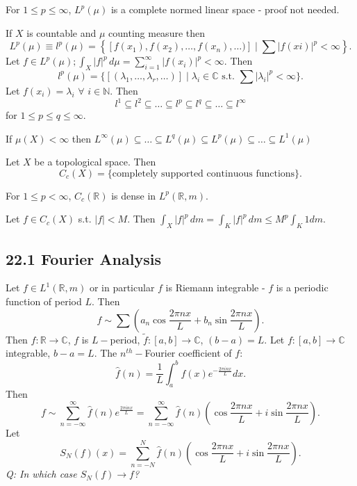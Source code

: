 \documentclass{functionspaces}
\begin{document}
\begin{theorem}\label{thm:Lp_complete}
For $1\leq p\leq\infty$, $L^{p}(\mu)$ is a complete normed linear space - proof not needed.
\end{theorem}

\begin{remark}\label{rem:lp_space}
If $X$ is countable and $\mu$ counting measure then
\[
L^{p}(\mu)\equiv l^{p}(\mu)=\left\{[f(x_{1}),f(x_{2}),\ldots,f(x_{n}),\ldots)]\mid\sum|f(xi)|^{p}<\infty\right\}.
\]
Let $f\in L^{p}(\mu);\int_{X}|f|^{p}\,d\mu=\sum_{i=1}^{\infty}|f(x_{i})|^{p}<\infty.$ Then
\[
l^{p}(\mu)=\{[(\lambda_{1},\ldots,\lambda_{r},\ldots)]\mid\lambda_{i}\in\mathbb{C}\text{ s.t. }\sum|\lambda_{i}|^{p}<\infty\}.
\]
Let $f(x_{i})=\lambda_{i}$ $\forall$ $i\in\mathbb{N}.$ Then
\[
l^{1}\subseteq l^{2}\subseteq\ldots\subseteq l^{p}\subseteq l^{q}\subseteq\ldots\subseteq l^{\infty}
\]
for $1\leq p\leq q\leq\infty.$
\end{remark}

\begin{theorem}\label{thm:Lp_inclusion}
If $\mu(X)<\infty$ then $L^{\infty}(\mu)\subseteq\ldots\subseteq L^{q}(\mu)\subseteq L^{p}(\mu)\subseteq\ldots\subseteq L^{1}(\mu)$
\end{theorem}

\begin{definition}\label{def:Cc}
Let $X$ be a topological space. Then
\[
C_{c}(X)=\{\text{completely supported continuous functions}\}.
\]
\end{definition}

\begin{theorem}\label{thm:Cc_dense}
For $1\leq p<\infty$, $C_{c}(\mathbb{R})$ is dense in $L^{p}(\mathbb{R},m).$
\end{theorem}

Let $f\in C_{c}(X)$ s.t. $|f|<M$. Then $\int_{X}|f|^{p}\,dm=\int_{K}|f|^{p}\,dm\leq M^{p}\int_{K}1dm.$

\subsection*{22.1 Fourier Analysis}

Let $f\in L^{1}(\mathbb{R},m)$ or in particular $f$ is Riemann integrable - $f$ is a periodic function of period $L$. Then
\[
f\sim\sum\left(a_{n}\cos\frac{2\pi nx}{L}+b_{n}\sin\frac{2\pi nx}{L}\right).
\]
Then $f:\mathbb{R}\rightarrow\mathbb{C}$, $f$ is $L-$period, $\tilde{f}:[a,b]\rightarrow\mathbb{C}$, $(b-a)=L$. Let $f:[a,b]\rightarrow\mathbb{C}$ integrable, $b-a=L$. The $n^{th}-$Fourier coefficient of $f$:
\[
\hat{f}(n)=\frac{1}{L}\int_{a}^{b}f(x)e^{-\frac{2\pi i nx}{L}}dx.
\]
Then
\[
f\sim\sum_{n=-\infty}^{\infty}\hat{f}(n)e^{\frac{2\pi i nx}{L}}=\sum_{n=-\infty}^{\infty}\hat{f}(n)\left(\cos\frac{2\pi nx}{L}+i\sin\frac{2\pi nx}{L}\right).
\]
Let
\[
S_{N}(f)(x)=\sum_{n=-N}^{N}\hat{f}(n)\left(\cos\frac{2\pi nx}{L}+i\sin\frac{2\pi nx}{L}\right).
\]
\emph{Q: In which case $S_{N}(f)\rightarrow f$?}
\end{document}
